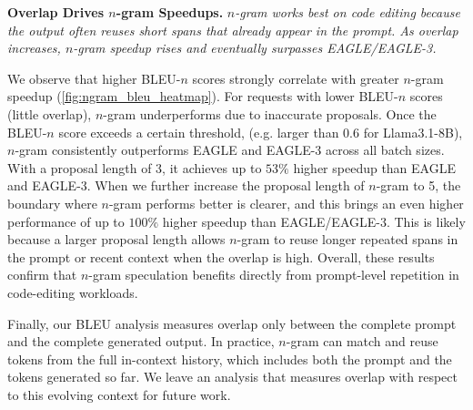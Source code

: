 \documentclass{article}
\newcommand{\jerry}[1]{\textcolor{cyan}{Jerry: #1}}
\begin{document}
\begin{quoting}[leftmargin=1.5em, rightmargin=1.5em, vskip=0pt]
\textbf{Overlap Drives $n$-gram Speedups.}
\emph{$n$-gram works best on code editing because the output often reuses short spans that already appear in the prompt. As overlap increases, $n$-gram speedup rises and eventually surpasses EAGLE/EAGLE-3.}
\end{quoting}
We observe that higher BLEU-$n$ scores strongly correlate with greater $n$-gram speedup (\autoref{fig:ngram_bleu_heatmap}). 
For requests with lower BLEU-$n$ scores (little overlap), $n$-gram underperforms due to inaccurate proposals. Once the BLEU-$n$ score exceeds a certain threshold, (e.g. larger than $0.6$ for Llama3.1-8B), $n$-gram consistently outperforms EAGLE and EAGLE-3 across all batch sizes. With a proposal length of 3, it achieves up to $53\%$ higher speedup than EAGLE and EAGLE-3. When we further increase the proposal length of $n$-gram to 5, the boundary where $n$-gram performs better is clearer, and this brings an even higher performance of up to $100\%$ higher speedup than EAGLE/EAGLE-3.
This is likely because a larger proposal length allows $n$-gram to reuse longer repeated spans in the prompt or recent context when the overlap is high. 
Overall, these results confirm that $n$-gram speculation benefits directly from prompt-level repetition in code-editing workloads. 

Finally, our BLEU analysis measures overlap only between the complete prompt and the complete generated output. In practice, $n$-gram can match and reuse tokens from the full in-context history, which includes both the prompt and the tokens generated so far. We leave an analysis that measures overlap with respect to this evolving context for future work.


\end{document}
